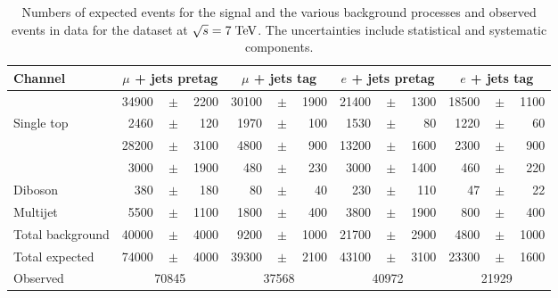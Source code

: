 \begin{table}
  \centering
  \begin{tabular}{ l  rrr  rrr  rrr  rrr }
    \toprule
    Channel & \multicolumn{3}{c}{$\mu$ + jets pretag} & \multicolumn{3}{c}{$\mu$ + jets tag} & \multicolumn{3}{c}{$e$ + jets pretag} & \multicolumn{3}{c}{$e$ + jets tag} \\ 
    \midrule
    \ttbar{}         & 34900 &$\!\!\!\pm\!\!\!$& 2200  & 30100 &$\!\!\!\pm\!\!\!$& 1900  & 21400 &$\!\!\!\pm\!\!\!$& 1300  & 18500 &$\!\!\!\pm\!\!\!$& 1100  \\ %
    Single top       & 2460  &$\!\!\!\pm\!\!\!$& 120   & 1970  &$\!\!\!\pm\!\!\!$& 100   & 1530  &$\!\!\!\pm\!\!\!$& 80    & 1220  &$\!\!\!\pm\!\!\!$& 60   \\ 
    \wjets{}         & 28200 &$\!\!\!\pm\!\!\!$& 3100  & 4800  &$\!\!\!\pm\!\!\!$& 900   & 13200 &$\!\!\!\pm\!\!\!$& 1600  & 2300  &$\!\!\!\pm\!\!\!$& 900  \\
    \zjets{}         & 3000  &$\!\!\!\pm\!\!\!$& 1900  & 480   &$\!\!\!\pm\!\!\!$& 230   & 3000  &$\!\!\!\pm\!\!\!$& 1400  & 460   &$\!\!\!\pm\!\!\!$& 220   \\
    Diboson          & 380   &$\!\!\!\pm\!\!\!$& 180   & 80    &$\!\!\!\pm\!\!\!$& 40    & 230   &$\!\!\!\pm\!\!\!$& 110   & 47    &$\!\!\!\pm\!\!\!$& 22   \\ 
    Multijet      & 5500  &$\!\!\!\pm\!\!\!$& 1100  & 1800
    &$\!\!\!\pm\!\!\!$& 400   & 3800  &$\!\!\!\pm\!\!\!$& 1900  & 800
    &$\!\!\!\pm\!\!\!$& 400  \\ 
    \midrule
    Total background & 40000 &$\!\!\!\pm\!\!\!$& 4000  & 9200
    &$\!\!\!\pm\!\!\!$& 1000  & 21700 &$\!\!\!\pm\!\!\!$& 2900  & 4800
    &$\!\!\!\pm\!\!\!$& 1000  \\ 
    \midrule
    Total expected     & 74000 &$\!\!\!\pm\!\!\!$ & 4000 & 39300
    &$\!\!\!\pm\!\!\!$& 2100  & 43100 &$\!\!\!\pm\!\!\!$& 3100 & 23300
    &$\!\!\!\pm\!\!\!$& 1600  \\
    \midrule
    Observed                & \multicolumn{3}{c}{70845}  & \multicolumn{3}{c}{37568} & \multicolumn{3}{c}{40972}      & \multicolumn{3}{c}{21929} \\
    \bottomrule
  \end{tabular}
  \caption[Event yields for the samples at $\sqrt{s} = 7 \TeV{}$]{
    Numbers of expected events for the \ttbar{} signal and the various background 
    processes and observed events in data for the dataset 
    at $\sqrt{s} = 7 \TeV{}$.
    The uncertainties include statistical and systematic components.}
  \label{tab:yields2011}
\end{table}


